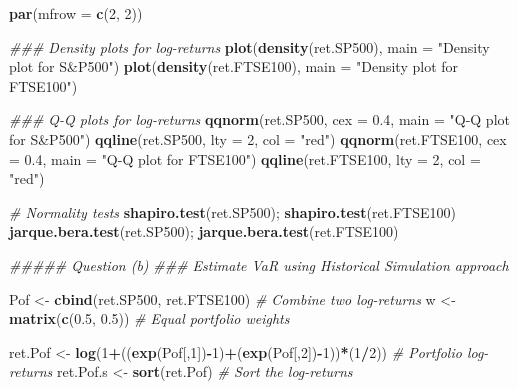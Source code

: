 \documentclass[]{article}
\newenvironment{Shaded}{\begin{snugshade}}{\end{snugshade}}
\newcommand{\CommentTok}[1]{\textcolor[rgb]{0.56,0.35,0.01}{\textit{#1}}}
\newcommand{\DataTypeTok}[1]{\textcolor[rgb]{0.13,0.29,0.53}{#1}}
\newcommand{\DecValTok}[1]{\textcolor[rgb]{0.00,0.00,0.81}{#1}}
\newcommand{\FloatTok}[1]{\textcolor[rgb]{0.00,0.00,0.81}{#1}}
\newcommand{\KeywordTok}[1]{\textcolor[rgb]{0.13,0.29,0.53}{\textbf{#1}}}
\newcommand{\NormalTok}[1]{#1}
\newcommand{\OperatorTok}[1]{\textcolor[rgb]{0.81,0.36,0.00}{\textbf{#1}}}
\newcommand{\StringTok}[1]{\textcolor[rgb]{0.31,0.60,0.02}{#1}}
\begin{document}
\begin{Shaded}
\begin{Highlighting}[]
{\KeywordTok{par}\NormalTok{(}\DataTypeTok{mfrow =} \KeywordTok{c}\NormalTok{(}\DecValTok{2}\NormalTok{, }\DecValTok{2}\NormalTok{))}

\CommentTok{### Density plots for log-returns}
\KeywordTok{plot}\NormalTok{(}\KeywordTok{density}\NormalTok{(ret.SP500), }\DataTypeTok{main =} \StringTok{"Density plot for S&P500"}\NormalTok{)}
\KeywordTok{plot}\NormalTok{(}\KeywordTok{density}\NormalTok{(ret.FTSE100), }\DataTypeTok{main =} \StringTok{"Density plot for FTSE100"}\NormalTok{)}

\CommentTok{### Q-Q plots for log-returns}
\KeywordTok{qqnorm}\NormalTok{(ret.SP500, }\DataTypeTok{cex =} \FloatTok{0.4}\NormalTok{, }\DataTypeTok{main =} \StringTok{"Q-Q plot for S&P500"}\NormalTok{)}
\KeywordTok{qqline}\NormalTok{(ret.SP500, }\DataTypeTok{lty =} \DecValTok{2}\NormalTok{, }\DataTypeTok{col =} \StringTok{"red"}\NormalTok{)}
\KeywordTok{qqnorm}\NormalTok{(ret.FTSE100, }\DataTypeTok{cex =} \FloatTok{0.4}\NormalTok{, }\DataTypeTok{main =} \StringTok{"Q-Q plot for FTSE100"}\NormalTok{)}
\KeywordTok{qqline}\NormalTok{(ret.FTSE100, }\DataTypeTok{lty =} \DecValTok{2}\NormalTok{, }\DataTypeTok{col =} \StringTok{"red"}\NormalTok{)}

\CommentTok{# Normality tests}
\KeywordTok{shapiro.test}\NormalTok{(ret.SP500); }\KeywordTok{shapiro.test}\NormalTok{(ret.FTSE100)}
\KeywordTok{jarque.bera.test}\NormalTok{(ret.SP500); }\KeywordTok{jarque.bera.test}\NormalTok{(ret.FTSE100)}

\CommentTok{##### Question (b)}
\CommentTok{### Estimate VaR using Historical Simulation approach}

\NormalTok{Pof <-}\StringTok{ }\KeywordTok{cbind}\NormalTok{(ret.SP500, ret.FTSE100)                          }\CommentTok{# Combine two log-returns }
\NormalTok{w <-}\StringTok{ }\KeywordTok{matrix}\NormalTok{(}\KeywordTok{c}\NormalTok{(}\FloatTok{0.5}\NormalTok{, }\FloatTok{0.5}\NormalTok{))                                      }\CommentTok{# Equal portfolio weights}

\NormalTok{ret.Pof <-}\StringTok{ }\KeywordTok{log}\NormalTok{(}\DecValTok{1}\OperatorTok{+}\NormalTok{((}\KeywordTok{exp}\NormalTok{(Pof[,}\DecValTok{1}\NormalTok{])}\OperatorTok{-}\DecValTok{1}\NormalTok{)}\OperatorTok{+}\NormalTok{(}\KeywordTok{exp}\NormalTok{(Pof[,}\DecValTok{2}\NormalTok{])}\OperatorTok{-}\DecValTok{1}\NormalTok{))}\OperatorTok{*}\NormalTok{(}\DecValTok{1}\OperatorTok{/}\DecValTok{2}\NormalTok{))   }\CommentTok{# Portfolio log-returns}
\NormalTok{ret.Pof.s <-}\StringTok{ }\KeywordTok{sort}\NormalTok{(ret.Pof)                                    }\CommentTok{# Sort the log-returns}

}
\end{Highlighting}
\end{Shaded}
\end{document}
